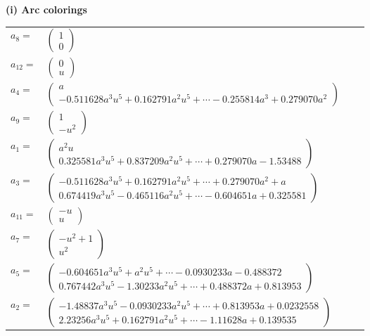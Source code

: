 \documentclass[1p]{elsarticle_modified}
\theoremstyle{definition}
\begin{document}
\flushleft \textbf{(i) Arc colorings}\\
\begin{tabular}{m{7pt} m{180pt} m{7pt} m{180pt} }
\flushright $a_{8}=$&$\begin{pmatrix}1\\0\end{pmatrix}$ \\
\flushright $a_{12}=$&$\begin{pmatrix}0\\u\end{pmatrix}$ \\
\flushright $a_{4}=$&$\begin{pmatrix}a\\-0.511628 a^{3} u^{5}+0.162791 a^{2} u^{5}+\cdots-0.255814 a^{3}+0.279070 a^{2}\end{pmatrix}$ \\
\flushright $a_{9}=$&$\begin{pmatrix}1\\- u^2\end{pmatrix}$ \\
\flushright $a_{1}=$&$\begin{pmatrix}a^2 u\\0.325581 a^{3} u^{5}+0.837209 a^{2} u^{5}+\cdots+0.279070 a-1.53488\end{pmatrix}$ \\
\flushright $a_{3}=$&$\begin{pmatrix}-0.511628 a^{3} u^{5}+0.162791 a^{2} u^{5}+\cdots+0.279070 a^{2}+a\\0.674419 a^{3} u^{5}-0.465116 a^{2} u^{5}+\cdots-0.604651 a+0.325581\end{pmatrix}$ \\
\flushright $a_{11}=$&$\begin{pmatrix}- u\\u\end{pmatrix}$ \\
\flushright $a_{7}=$&$\begin{pmatrix}- u^2+1\\u^2\end{pmatrix}$ \\
\flushright $a_{5}=$&$\begin{pmatrix}-0.604651 a^{3} u^{5}+a^{2} u^{5}+\cdots-0.0930233 a-0.488372\\0.767442 a^{3} u^{5}-1.30233 a^{2} u^{5}+\cdots+0.488372 a+0.813953\end{pmatrix}$ \\
\flushright $a_{2}=$&$\begin{pmatrix}-1.48837 a^{3} u^{5}-0.0930233 a^{2} u^{5}+\cdots+0.813953 a+0.0232558\\2.23256 a^{3} u^{5}+0.162791 a^{2} u^{5}+\cdots-1.11628 a+0.139535\end{pmatrix}$ \\

\end{tabular}
\end{document}
